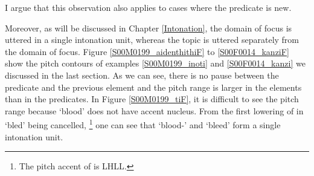 I argue that this observation also applies to cases where the predicate is new.

Moreover,
as will be discussed in Chapter \ref{Intonation},
the domain of focus is uttered in a single intonation unit,
whereas the topic is uttered separately from the domain of focus.
Figure \ref{S00M0199_aidenthithiF} to \ref{S00F0014_kanziF} show
the pitch contours of examples \ref{S00M0199_inoti} and \ref{S00F0014_kanzi} we discussed in the last section.
As we can see,
there is no pause between the predicate and the previous element and
the pitch range is larger in the elements than in the predicates.
In Figure \ref{S00M0199_tiF},
it is difficult to see the pitch range because  `blood' does not have accent nucleus.
From the first lowering of  in  `bled' being cancelled,%
	\footnote{
	The pitch accent of  is LHLL.
	}
one can see that
 `blood-' and  `bleed' form a single intonation unit.


